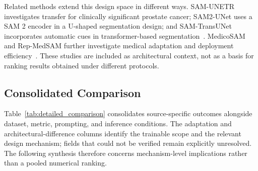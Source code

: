 \documentclass[5p,times,authoryear]{elsarticle}
\begin{document}
Related methods extend this design space in different ways. SAM-UNETR investigates transfer for clinically significant prostate cancer; SAM2-UNet uses a SAM 2 encoder in a U-shaped segmentation design; and SAM-TransUNet incorporates automatic cues in transformer-based segmentation~\citep{alzate2023sam,xiong2026sam2,qi2025sam}. MedicoSAM and Rep-MedSAM further investigate medical adaptation and deployment efficiency~\citep{archit2025medicosam,wei2024rep}. These studies are included as architectural context, not as a basis for ranking results obtained under different protocols.

\subsection{Consolidated Comparison}


Table~\ref{tab:detailed_comparison} consolidates source-specific outcomes alongside dataset, metric, prompting, and inference conditions. The adaptation and architectural-difference columns identify the trainable scope and the relevant design mechanism; fields that could not be verified remain explicitly unresolved. The following synthesis therefore concerns mechanism-level implications rather than a pooled numerical ranking.
\end{document}
